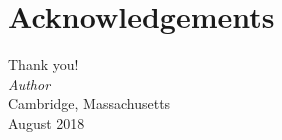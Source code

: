 %

\chapter*{Acknowledgements}


\lipsum[1]
Thank you! \\

\vspace{1em}
\mbox{} \hfill \textit{Author}\\
\mbox{} \hfill Cambridge, Massachusetts\\
\mbox{} \hfill August 2018
